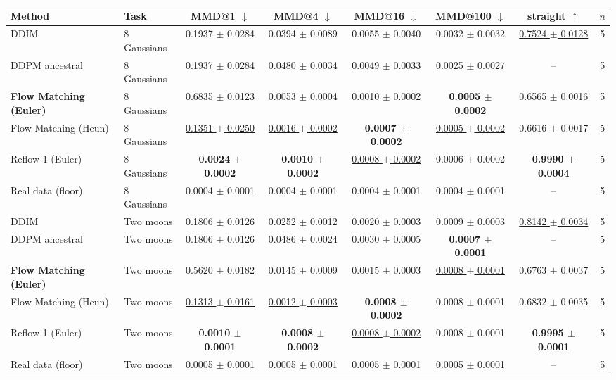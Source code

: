 \begin{tabular}{llcccccc}
\toprule
Method & Task & MMD@1 $\downarrow$ & MMD@4 $\downarrow$ & MMD@16 $\downarrow$ & MMD@100 $\downarrow$ & straight $\uparrow$ & $n$ \\
\midrule
DDIM & 8 Gaussians & 0.1937 $\pm$ 0.0284 & 0.0394 $\pm$ 0.0089 & 0.0055 $\pm$ 0.0040 & 0.0032 $\pm$ 0.0032 & \underline{0.7524 $\pm$ 0.0128} & 5 \\
DDPM ancestral & 8 Gaussians & 0.1937 $\pm$ 0.0284 & 0.0480 $\pm$ 0.0034 & 0.0049 $\pm$ 0.0033 & 0.0025 $\pm$ 0.0027 & -- & 5 \\
\textbf{Flow Matching (Euler)} & 8 Gaussians & 0.6835 $\pm$ 0.0123 & 0.0053 $\pm$ 0.0004 & 0.0010 $\pm$ 0.0002 & \textbf{0.0005 $\pm$ 0.0002} & 0.6565 $\pm$ 0.0016 & 5 \\
Flow Matching (Heun) & 8 Gaussians & \underline{0.1351 $\pm$ 0.0250} & \underline{0.0016 $\pm$ 0.0002} & \textbf{0.0007 $\pm$ 0.0002} & \underline{0.0005 $\pm$ 0.0002} & 0.6616 $\pm$ 0.0017 & 5 \\
Reflow-1 (Euler) & 8 Gaussians & \textbf{0.0024 $\pm$ 0.0002} & \textbf{0.0010 $\pm$ 0.0002} & \underline{0.0008 $\pm$ 0.0002} & 0.0006 $\pm$ 0.0002 & \textbf{0.9990 $\pm$ 0.0004} & 5 \\
Real data (floor) & 8 Gaussians & 0.0004 $\pm$ 0.0001 & 0.0004 $\pm$ 0.0001 & 0.0004 $\pm$ 0.0001 & 0.0004 $\pm$ 0.0001 & -- & 5 \\
\midrule
DDIM & Two moons & 0.1806 $\pm$ 0.0126 & 0.0252 $\pm$ 0.0012 & 0.0020 $\pm$ 0.0003 & 0.0009 $\pm$ 0.0003 & \underline{0.8142 $\pm$ 0.0034} & 5 \\
DDPM ancestral & Two moons & 0.1806 $\pm$ 0.0126 & 0.0486 $\pm$ 0.0024 & 0.0030 $\pm$ 0.0005 & \textbf{0.0007 $\pm$ 0.0001} & -- & 5 \\
\textbf{Flow Matching (Euler)} & Two moons & 0.5620 $\pm$ 0.0182 & 0.0145 $\pm$ 0.0009 & 0.0015 $\pm$ 0.0003 & \underline{0.0008 $\pm$ 0.0001} & 0.6763 $\pm$ 0.0037 & 5 \\
Flow Matching (Heun) & Two moons & \underline{0.1313 $\pm$ 0.0161} & \underline{0.0012 $\pm$ 0.0003} & \textbf{0.0008 $\pm$ 0.0002} & 0.0008 $\pm$ 0.0001 & 0.6832 $\pm$ 0.0035 & 5 \\
Reflow-1 (Euler) & Two moons & \textbf{0.0010 $\pm$ 0.0001} & \textbf{0.0008 $\pm$ 0.0002} & \underline{0.0008 $\pm$ 0.0002} & 0.0008 $\pm$ 0.0001 & \textbf{0.9995 $\pm$ 0.0001} & 5 \\
Real data (floor) & Two moons & 0.0005 $\pm$ 0.0001 & 0.0005 $\pm$ 0.0001 & 0.0005 $\pm$ 0.0001 & 0.0005 $\pm$ 0.0001 & -- & 5 \\

\end{tabular}
